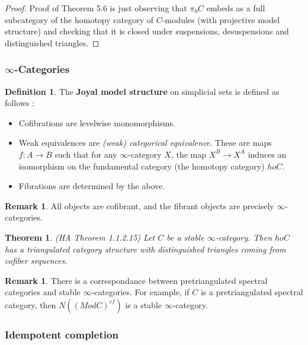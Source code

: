 \documentclass[letterpaper]{article}
\newtheorem{theorem}{Theorem}
\theoremstyle{definition}
\newtheorem{definition}[lemma]{Definition}
\newtheorem{remark}[lemma]{Remark}
\begin{document}
\begin{proof}
Proof of Theorem 5.6 is just observing that $\pi_0 C$ embeds as a full subcategory of the homotopy category of $C$-modules (with projective model structure) and checking that it is closed under suspensions, desuspensions and distinguished triangles. 
\end{proof}

\subsubsection{$\infty$-Categories}

\begin{definition} The \textbf{Joyal model structure} on simplicial sets is defined as follows : 
\begin{itemize}
\item Cofibrations are levelwise monomorphisms.
\item Weak equivalences are \textit{(weak) categorical equivalence}. These are maps $f : A \rightarrow B$ such that for any $\infty$-category $X$, the map $X^B \rightarrow X^A$ induces an isomorphism on the fundamental category (the homotopy category) $ho C$. 
\item Fibrations are determined by the above. 
\end{itemize}
\end{definition}

\begin{remark}
All objects are cofibrant, and the fibrant objects are precisely $\infty$-categories. 
\end{remark}

\begin{theorem}(HA Theorem 1.1.2.15) Let $C$ be a stable $\infty$-category. Then $ho C$ has a triangulated category structure with distinguished triangles coming from cofiber sequences. 
\end{theorem}

\begin{remark}
There is a correspondance between pretriangulated spectral categories and stable $\infty$-categories. For example, if $C$ is a pretriangulated spectral category, then $N((ModC)^{cf})$ is a stable $\infty$-category. 
\end{remark}

\subsubsection{Idempotent completion}
\end{document}
